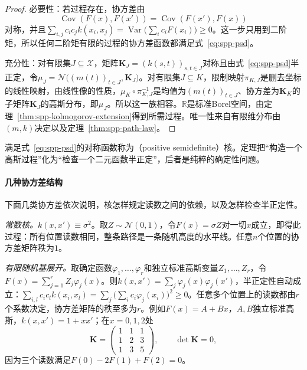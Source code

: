 \begin{proof}
必要性：若过程存在，协方差由
\[
  \operatorname{Cov}(F(x),F(x'))=\operatorname{Cov}(F(x'),F(x))
\]
对称，并且$\sum_{i,j}c_ic_jk(x_i,x_j)=\operatorname{Var}\bigl(\sum_ic_iF(x_i)\bigr)\ge0$。这一步只用到二阶矩，所以任何二阶矩有限的过程的协方差函数都满足式~\eqref{eq:spp-psd}。

充分性：对有限集$J\subseteq\mathcal X$，矩阵$\bm K_J=(k(s,t))_{s,t\in J}$对称且由式~\eqref{eq:spp-psd}半正定，令$\mu_J=\mathcal N\bigl((m(t))_{t\in J},\bm K_J\bigr)$。对有限集$J\subseteq K$，限制映射$\pi_{K,J}$是删去坐标的线性映射，由线性像的性质，$\mu_K\circ\pi_{K,J}^{-1}$是均值为$(m(t))_{t\in J}$、协方差为$\bm K_K$的子矩阵$\bm K_J$的高斯分布，即$\mu_J$。所以这一族相容。$\mathbb R$是标准Borel空间，由定理~\ref{thm:spp-kolmogorov-extension}得到所需过程。唯一性来自有限维分布由$(m,k)$决定以及定理~\ref{thm:spp-path-law}。
\end{proof}

满足式~\eqref{eq:spp-psd}的对称函数称为（positive semidefinite）核。定理把“构造一个高斯过程”化为“检查一个二元函数半正定”，后者是纯粹的确定性问题。

\paragraph{几种协方差结构}
下面几类协方差依次说明，核怎样规定读数之间的依赖，以及怎样检查半正定性。

\emph{常数核。}$k(x,x')\equiv\sigma^2$。取$Z\sim\mathcal N(0,1)$，令$F(x)=\sigma Z$对一切$x$成立，即得此过程：所有位置读数相同，整条路径是一条随机高度的水平线。任意$n$个位置的协方差矩阵秩为$1$。

\emph{有限随机基展开。}取确定函数$\varphi_1,\ldots,\varphi_r$和独立标准高斯变量$Z_1,\ldots,Z_r$，令$F(x)=\sum_{j=1}^rZ_j\varphi_j(x)$。则$k(x,x')=\sum_j\varphi_j(x)\varphi_j(x')$，半正定性自动成立：$\sum_{i,l}c_ic_lk(x_i,x_l)=\sum_j\bigl(\sum_ic_i\varphi_j(x_i)\bigr)^2\ge0$。任意多个位置上的读数都由$r$个系数决定，协方差矩阵的秩至多为$r$。例如$F(x)=A+Bx$，$A,B$独立标准高斯，$k(x,x')=1+xx'$；在$x=0,1,2$处
\[
  \bm K=\begin{pmatrix}1&1&1\\1&2&3\\1&3&5\end{pmatrix},\qquad \det\bm K=0,
\]
因为三个读数满足$F(0)-2F(1)+F(2)=0$。


